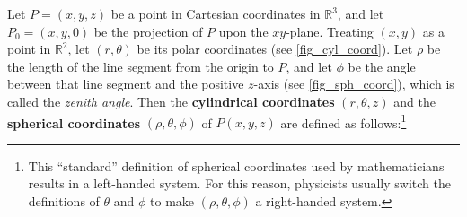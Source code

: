
Let $P = (x,y,z)$ be a point in Cartesian coordinates in $\mathbb{R}^{3}$, and let $P_0 = (x,y,0)$ be the projection of $P$ upon the $xy$-plane. Treating $(x,y)$ as a point in $\mathbb{R}^{2}$, let $(r,\theta)$ be its polar coordinates (see \autoref{fig_cyl_coord}). Let $\rho$ be the length of the line segment from the origin to $P$, and let $\phi$ be the angle between that line segment and the positive $z$-axis (see \autoref{fig_sph_coord}), which is called the \emph{zenith angle}. Then the \textbf{cylindrical coordinates} $(r,\theta,z)$  and the \textbf{spherical coordinates} $(\rho,\theta,\phi)$ of $P(x,y,z)$ are defined as follows:\footnote{This ``standard'' definition of spherical coordinates used by mathematicians results in a left-handed system. For this reason, physicists usually switch the definitions of $\theta$ and $\phi$ to make $(\rho,\theta,\phi)$ a right-handed system.}

